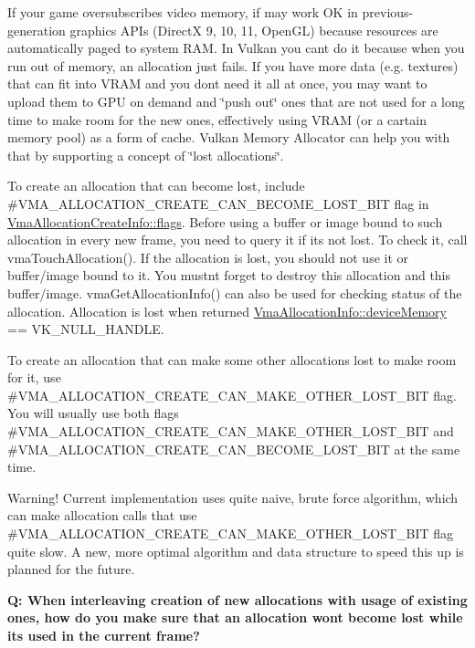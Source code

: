 If your game oversubscribes video memory, if may work OK in previous-\/generation graphics APIs (DirectX 9, 10, 11, Open\+GL) because resources are automatically paged to system RAM. In Vulkan you can\textquotesingle{}t do it because when you run out of memory, an allocation just fails. If you have more data (e.\+g. textures) that can fit into VRAM and you don\textquotesingle{}t need it all at once, you may want to upload them to GPU on demand and \char`\"{}push out\char`\"{} ones that are not used for a long time to make room for the new ones, effectively using VRAM (or a cartain memory pool) as a form of cache. Vulkan Memory Allocator can help you with that by supporting a concept of \char`\"{}lost allocations\char`\"{}.

To create an allocation that can become lost, include \#\+VMA\+\_\+\+ALLOCATION\+\_\+\+CREATE\+\_\+\+CAN\+\_\+\+BECOME\+\_\+\+LOST\+\_\+\+BIT flag in \mbox{\hyperlink{structVmaAllocationCreateInfo_add09658ac14fe290ace25470ddd6d41b}{Vma\+Allocation\+Create\+Info\+::flags}}. Before using a buffer or image bound to such allocation in every new frame, you need to query it if it\textquotesingle{}s not lost. To check it, call vma\+Touch\+Allocation(). If the allocation is lost, you should not use it or buffer/image bound to it. You mustn\textquotesingle{}t forget to destroy this allocation and this buffer/image. vma\+Get\+Allocation\+Info() can also be used for checking status of the allocation. Allocation is lost when returned \mbox{\hyperlink{structVmaAllocationInfo_abaf12cc4e13fbe5208ca6e5bb1a21c19}{Vma\+Allocation\+Info\+::device\+Memory}} == {\ttfamily VK\+\_\+\+NULL\+\_\+\+HANDLE}.

To create an allocation that can make some other allocations lost to make room for it, use \#\+VMA\+\_\+\+ALLOCATION\+\_\+\+CREATE\+\_\+\+CAN\+\_\+\+MAKE\+\_\+\+OTHER\+\_\+\+LOST\+\_\+\+BIT flag. You will usually use both flags \#\+VMA\+\_\+\+ALLOCATION\+\_\+\+CREATE\+\_\+\+CAN\+\_\+\+MAKE\+\_\+\+OTHER\+\_\+\+LOST\+\_\+\+BIT and \#\+VMA\+\_\+\+ALLOCATION\+\_\+\+CREATE\+\_\+\+CAN\+\_\+\+BECOME\+\_\+\+LOST\+\_\+\+BIT at the same time.

Warning! Current implementation uses quite naive, brute force algorithm, which can make allocation calls that use \#\+VMA\+\_\+\+ALLOCATION\+\_\+\+CREATE\+\_\+\+CAN\+\_\+\+MAKE\+\_\+\+OTHER\+\_\+\+LOST\+\_\+\+BIT flag quite slow. A new, more optimal algorithm and data structure to speed this up is planned for the future.

{\bfseries{Q\+: When interleaving creation of new allocations with usage of existing ones, how do you make sure that an allocation won\textquotesingle{}t become lost while it\textquotesingle{}s used in the current frame?}}

